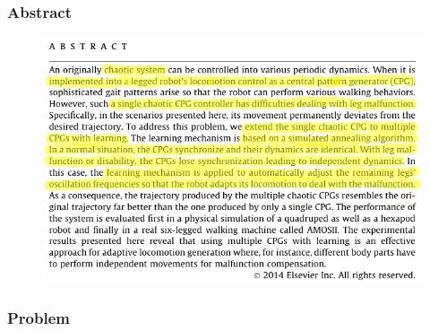\documentclass{beamer}
\begin{document}
\begin{frame}
\frametitle{Abstract}
\begin{figure}
\center
\includegraphics[width=1\textwidth]{figs/abstract-a.pdf}
\end{figure}
\end{frame}

\begin{frame}

\frametitle{Problem}
\begin{figure}
\center
{}
\end{figure}
\end{frame}
\end{document}
